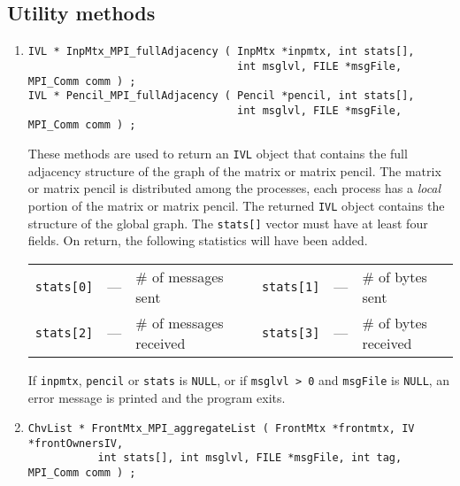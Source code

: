 \subsection{Utility methods}
\label{subsection:MPI:proto:utility}
\par
\begin{enumerate}
\item
\begin{verbatim}
IVL * InpMtx_MPI_fullAdjacency ( InpMtx *inpmtx, int stats[], 
                                 int msglvl, FILE *msgFile, MPI_Comm comm ) ;
IVL * Pencil_MPI_fullAdjacency ( Pencil *pencil, int stats[], 
                                 int msglvl, FILE *msgFile, MPI_Comm comm ) ;
\end{verbatim}
These methods are used to return an {\tt IVL} object that contains
the full adjacency structure of the graph of the matrix 
or matrix pencil.
The matrix or matrix pencil is distributed among the processes,
each process has a {\it local} portion of the matrix or matrix pencil.
The returned {\tt IVL} object contains the structure of the global
graph.
The {\tt stats[]} vector must have at least four fields.
On return, the following statistics will have been added.
\begin{center}
\begin{tabular}{cclcccl}
{\tt stats[0]} & --- & \# of messages sent 
& &
{\tt stats[1]} & --- & \# of bytes sent \\
{\tt stats[2]} & --- & \# of messages received 
& &
{\tt stats[3]} & --- & \# of bytes received 
\end{tabular}
\end{center}
\par {}
If {\tt inpmtx}, {\tt pencil} or {\tt stats} is {\tt NULL}, 
or if {\tt msglvl > 0} and {\tt msgFile} is {\tt NULL},
an error message is printed and the program exits.
\item
\begin{verbatim}
ChvList * FrontMtx_MPI_aggregateList ( FrontMtx *frontmtx, IV *frontOwnersIV, 
           int stats[], int msglvl, FILE *msgFile, int tag, MPI_Comm comm ) ;
\end{verbatim}

\end{enumerate}
